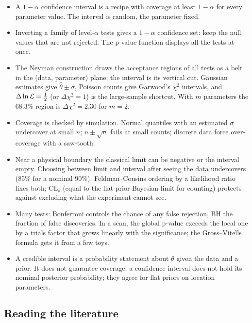 \begin{recap}
\begin{itemize}
  \item A $1-\alpha$ confidence interval is a recipe with coverage at least
        $1-\alpha$ for every parameter value. The interval is random, the parameter
        fixed.
  \item Inverting a family of level-$\alpha$ tests gives a $1-\alpha$ confidence
        set: keep the null values that are not rejected. The p-value function
        displays all the tests at once.
  \item The Neyman construction draws the acceptance regions of all tests as a belt
        in the (data, parameter) plane; the interval is its vertical cut. Gaussian
        estimates give $\hat\theta\pm\sigma$, Poisson counts give Garwood's
        $\chi^2$ intervals, and $\Delta\ln\mathcal{L}=\tfrac12$ (or $\Delta\chi^2=1$) is
        the large-sample shortcut. With $m$ parameters the $68.3\%$ region is
        $\Delta\chi^2=2.30$ for $m=2$.
  \item Coverage is checked by simulation. Normal quantiles with an estimated
        $\sigma$ undercover at small $n$; $n\pm\sqrt n$ fails at small counts;
        discrete data force over-coverage with a saw-tooth.
  \item Near a physical boundary the classical limit can be negative or the
        interval empty. Choosing between limit and interval after seeing the data
        undercovers ($85\%$ for a nominal $90\%$). Feldman--Cousins ordering by a
        likelihood ratio fixes both; CL$_s$ (equal to the flat-prior Bayesian limit
        for counting) protects against excluding what the experiment cannot see.
  \item Many tests: Bonferroni controls the chance of any false rejection, BH the
        fraction of false discoveries. In a scan, the global p-value exceeds the
        local one by a trials factor that grows linearly with the significance;
        the Gross--Vitells formula gets it from a few toys.
  \item A credible interval is a probability statement about $\theta$ given the data
        and a prior. It does not guarantee coverage; a confidence interval does not
        hold its nominal posterior probability; they agree for flat priors on location
        parameters.
\end{itemize}
\end{recap}

\subsection*{Reading the literature}
\label{4b:sec:literature}

